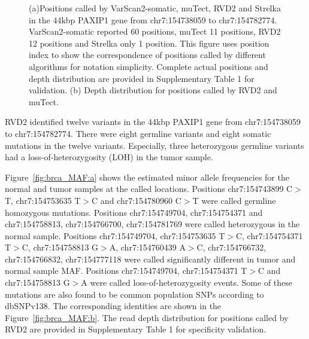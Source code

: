 \documentclass{bioinfo}
\begin{document}
\begin{figure}[!pthb]
    \centering
    \caption{(a)Positions called by VarScan2-somatic, muTect, RVD2 and Strelka in the 44kbp PAXIP1 gene from chr7:154738059 to chr7:154782774. VarScan2-somatic reported 60 positions, muTect 11 positions, RVD2 12 positions and Strelka only 1 position. This figure uses position index to show the correspondence of positions called by different algorithms for notation simplicity. Complete actual positions and depth distribution are provided in Supplementary Table 1 for validation. (b) Depth distribution for positions called by RVD2 and muTect.}%
    \label{fig:brca_dot}%
\end{figure}

RVD2 identified twelve variants in the 44kbp PAXIP1 gene from chr7:154738059 to chr7:154782774. There were eight germline variants and eight somatic mutations in the twelve variants. Especially, three heterozygous germline variants had a loss-of-heterozygosity (LOH) in the tumor sample.

Figure~\ref{fig:brca_MAF:a} shows the estimated minor allele frequencies for the normal and tumor samples at the called locations. Positions chr7:154743899 C$>$T, chr7:154753635 T$>$C and chr7:154780960 C$>$T were called germline homozygous mutations. Positions chr7:154749704, chr7:154754371 and chr7:154758813, chr7:154766700, chr7:154781769 were called heterozygous in the normal sample. Positions chr7:154749704, chr7:154753635 T$>$C, chr7:154754371 T$>$C, chr7:154758813 G$>$A, chr7:154760439 A$>$C, chr7:154766732,  chr7:154766832, chr7:154777118 were called significantly different in tumor and normal sample MAF. Positions chr7:154749704, chr7:154754371 T$>$C and chr7:154758813 G$>$A were called loss-of-heterozygosity events. Some of these mutations are also found to be common population SNPs according to dbSNPv138. The corresponding identities are shown in the Figure~\ref{fig:brca_MAF:b}. The read depth distribution for positions called by RVD2 are provided in Supplementary Table 1 for specificity validation. 
\end{document}
